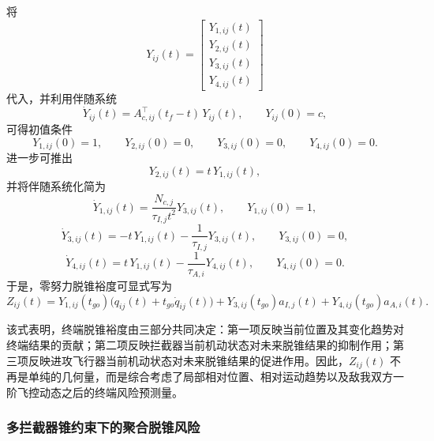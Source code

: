 将
\begin{equation}
Y_{ij}(t)=
\begin{bmatrix}
Y_{1,ij}(t)\\
Y_{2,ij}(t)\\
Y_{3,ij}(t)\\
Y_{4,ij}(t)
\end{bmatrix}
\end{equation}
代入，并利用伴随系统
\begin{equation}
\dot Y_{ij}(t)=A_{c,ij}^{\top}(t_f-t)\,Y_{ij}(t),
\qquad
Y_{ij}(0)=c,
\end{equation}
可得初值条件
\begin{equation}
Y_{1,ij}(0)=1,\qquad
Y_{2,ij}(0)=0,\qquad
Y_{3,ij}(0)=0,\qquad
Y_{4,ij}(0)=0.
\end{equation}
进一步可推出
\begin{equation}
Y_{2,ij}(t)=t\,Y_{1,ij}(t),
\end{equation}
并将伴随系统化简为
\begin{equation}
\dot Y_{1,ij}(t)
=
\frac{N_{c,j}}{\tau_{I,j}t^{2}}Y_{3,ij}(t),
\qquad
Y_{1,ij}(0)=1,
\end{equation}
\begin{equation}
\dot Y_{3,ij}(t)
=
-t\,Y_{1,ij}(t)-\frac{1}{\tau_{I,j}}Y_{3,ij}(t),
\qquad
Y_{3,ij}(0)=0,
\end{equation}
\begin{equation}
\dot Y_{4,ij}(t)
=
t\,Y_{1,ij}(t)-\frac{1}{\tau_{A,i}}Y_{4,ij}(t),
\qquad
Y_{4,ij}(0)=0.
\end{equation}
于是，零努力脱锥裕度可显式写为
\begin{equation}
Z_{ij}(t)
=
Y_{1,ij}(t_{go})
\bigl(
q_{ij}(t)+t_{go}\dot q_{ij}(t)
\bigr)
+
Y_{3,ij}(t_{go})a_{I,j}(t)
+
Y_{4,ij}(t_{go})a_{A,i}(t).
\end{equation}

该式表明，终端脱锥裕度由三部分共同决定：第一项反映当前位置及其变化趋势对终端结果的贡献；第二项反映拦截器当前机动状态对未来脱锥结果的抑制作用；第三项反映进攻飞行器当前机动状态对未来脱锥结果的促进作用。因此，$Z_{ij}(t)$ 不再是单纯的几何量，而是综合考虑了局部相对位置、相对运动趋势以及敌我双方一阶飞控动态之后的终端风险预测量。

\subsubsection{多拦截器锥约束下的聚合脱锥风险}

